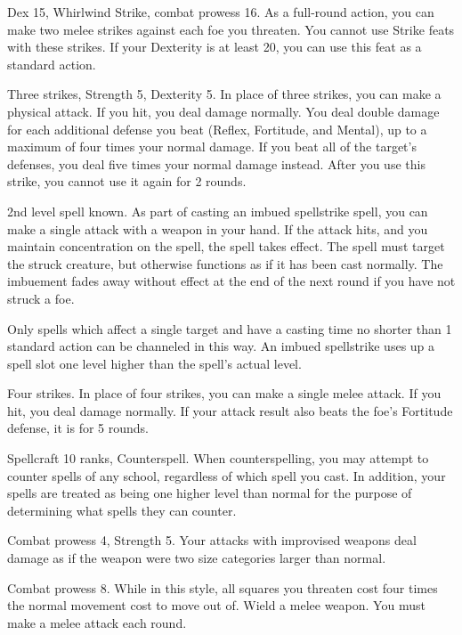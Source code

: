 \featpres Dex 15, Whirlwind Strike, combat prowess 16.
\featben As a full-round action, you can make two melee strikes against each foe you threaten. You cannot use Strike feats with these strikes.
If your Dexterity is at least 20, you can use this feat as a standard action.

\featpres Three strikes, Strength 5, Dexterity 5.
\featben In place of three strikes, you can make a physical attack.
If you hit, you deal damage normally.
You deal double damage for each additional defense you beat (Reflex, Fortitude, and Mental), up to a maximum of four times your normal damage.
If you beat all of the target's defenses, you deal five times your normal damage instead.
After you use this strike, you cannot use it again for 2 rounds.

\featpre 2nd level spell known.
\featben As part of casting an imbued spellstrike spell, you can make a single attack with a weapon in your hand.
If the attack hits, and you maintain concentration on the spell, the spell takes effect.
The spell must target the struck creature, but otherwise functions as if it has been cast normally.
The imbuement fades away without effect at the end of the next round if you have not struck a foe.

Only spells which affect a single target and have a casting time no shorter than 1 standard action can be channeled in this way.
An imbued spellstrike uses up a spell slot one level higher than the spell's actual level.

\featpre Four strikes.
\featben In place of four strikes, you can make a single melee attack.
If you hit, you deal damage normally.
If your attack result also beats the foe's Fortitude defense, it is \immobilized for 5 rounds.

\featpres Spellcraft 10 ranks, Counterspell.
\featben When counterspelling, you may attempt to counter spells of any school, regardless of which spell you cast.
In addition, your spells are treated as being one higher level than normal for the purpose of determining what spells they can counter.

\featpres Combat prowess 4, Strength 5.
\featben Your attacks with improvised weapons deal damage as if the weapon were two size categories larger than normal.

\featpre Combat prowess 8.
\featben While in this style, all squares you threaten cost four times the normal movement cost to move out of.
\stylereq Wield a melee weapon.
You must make a melee attack each round.

